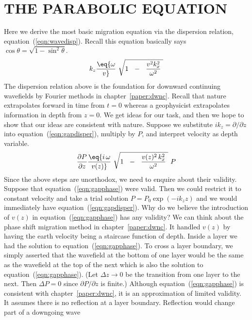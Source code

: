 \section{THE PARABOLIC EQUATION}
Here we derive the most basic migration equation
via the dispersion relation,
equation~(\ref{eqn:wavedisp}).
Recall this equation basically says $\cos\theta=\sqrt{1-\sin^2\theta}$.
\begin{equation}
k_z  \eq 
{ \omega     \over v} \
\sqrt{
        1  \ \ -\ \  {v^2k_x^2 \over   \omega^2 } \ 
        }
\label{eqn:gapdisper}
\end{equation}
The dispersion relation above is the foundation
for downward continuing wavefields by Fourier
methods in chapter~\ref{paper:dwnc}.
Recall that nature extrapolates forward in time from $t=0$
whereas a geophysicist extrapolates information
in depth from $z=0$.
We get ideas for our task,
and then we hope to show that our ideas are
consistent with nature.
Suppose we substitute $ik_z=\partial/\partial z$
into equation~(\ref{eqn:gapdisper}), multiply by $P$,
and interpret velocity as depth variable.
\begin{equation}
{\partial P   \over  \partial z }  \eq 
{ i \, \omega     \over v(z)} \
\sqrt{
        1  \ \ -\ \  {v(z)^2\, k_x^2 \over   \omega^2 } \ 
        }
\ P
\label{eqn:gapphase}
\end{equation}
Since the above steps are unorthodox,
we need to enquire about their validity.
Suppose that equation~(\ref{eqn:gapphase}) were valid.
Then we could restrict it to constant velocity
and take a trial solution $P=P_0\exp(-ik_z z)$ and we
would immediately have equation~(\ref{eqn:gapdisper}).
Why do we believe the introduction of $v(z)$ in
equation~(\ref{eqn:gapphase}) has any validity?
We can think about the phase shift migration method
in chapter~\ref{paper:dwnc}.
It handled $v(z)$ by having the earth velocity
being a staircase function of depth.
Inside a layer we had the solution to
equation~(\ref{eqn:gapphase}).
To cross a layer boundary,
we simply asserted that the wavefield at the bottom
of one layer would be the same as the wavefield
at the top of the next
which is also the solution to
equation~(\ref{eqn:gapphase}).
(Let $\Delta z \rightarrow 0$
be the transition from one layer to the next.
Then $\Delta P=0$ since $\partial P/\partial z$ is finite.)
Although equation~(\ref{eqn:gapphase}) is consistent
with chapter~\ref{paper:dwnc},
it is an approximation of limited validity.
It assumes there is no reflection at a layer boundary.
Reflection would change part of a downgoing wave
